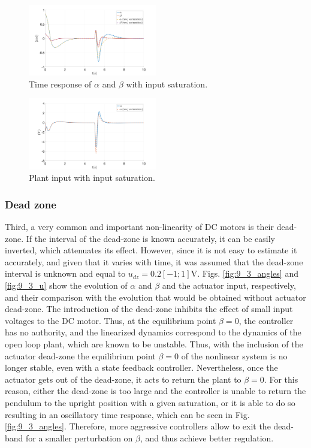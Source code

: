 \documentclass[letterpaper, 10 pt, conference]{ieeeconf}
\begin{document}
\begin{figure}[h]
    \centering
    \includegraphics[width = 0.5\textwidth]{figures/9_2_angles.png}
    \caption{Time response of $\alpha$ and $\beta$ with input saturation.}
    \label{fig:9_2_angles}
\end{figure}
\begin{figure}[h]
    \centering
    \includegraphics[width = 0.5\textwidth]{figures/9_2_u.png}
    \caption{Plant input with input saturation.}
    \label{fig:9_2_u}
\end{figure}

\subsubsection{Dead zone} Third, a very common and important non-linearity of DC motors is their dead-zone. If the interval of the dead-zone is known accurately, it can be easily inverted, which attenuates its effect. However, since it is not easy to estimate it accurately, and given that it varies with time, it was assumed that the dead-zone interval is unknown and equal to $u_{dz} = 0.2[-1;1]$V. Figs. \ref{fig:9_3_angles} and \ref{fig:9_3_u} show the evolution of $\alpha$ and $\beta$ and the actuator input, respectively, and their comparison with the evolution that would be obtained without actuator dead-zone. The introduction of the dead-zone inhibits the effect of small input voltages to the DC motor. Thus, at the equilibrium point $\beta = 0$, the controller has no authority, and the linearized dynamics correspond to the dynamics of the open loop plant, which are known to be unstable. Thus, with the inclusion of the actuator dead-zone the equilibrium point $\beta = 0$ of the nonlinear system is no longer stable, even with a state feedback controller. Nevertheless, once the actuator gets out of the dead-zone, it acts to return the plant to $\beta = 0$. For this reason, either the dead-zone is too large and the controller is unable to return the pendulum to the upright position with a given saturation, or it is able to do so resulting in an oscillatory time response, which can be seen in Fig. \ref{fig:9_3_angles}. Therefore, more aggressive controllers allow to exit the dead-band for a smaller perturbation on $\beta$, and thus achieve better regulation.
\end{document}
